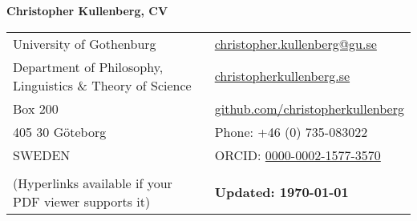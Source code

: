 \documentclass[a4paper,11pt,oneside]{article}
\begin{document}

\noindent  \LARGE{\textbf{Christopher Kullenberg, CV}}  \\
\vspace{-2ex}
\hline
\normalsize

\begin{center}
\begin{tabular}{l l}
 University of Gothenburg    & \hspace{.2in} \href{mailto:christopher.kullenberg@gu.se}{christopher.kullenberg@gu.se} \\
 Department of Philosophy, Linguistics \& Theory of Science    & \hspace{.2in}  \href{http://christopherkullenberg.se}{christopherkullenberg.se}   \\
 Box 200             & \hspace{.2in}  \href{https://github.com/christopherkullenberg}{github.com/christopherkullenberg}   \\
 405 30 Göteborg & \hspace{.2in} Phone: +46 (0) 735-083022 \\
 SWEDEN & \hspace{.2in} ORCID: \href{http://orcid.org/0000-0002-1577-3570}{0000-0002-1577-3570} \\
 \\ (Hyperlinks available if your PDF viewer supports it) & \hspace{.2in}  \textbf{Updated: \today} \\
\end{tabular}
\end{center}

\vspace{1em}
\end{document}
